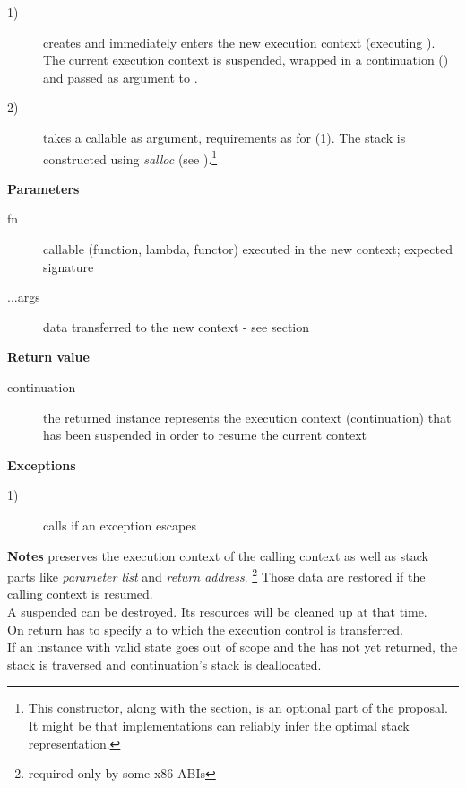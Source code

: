 \begin{description}
    \item[1)] creates and immediately enters the new execution context
              (executing ). The current execution context is suspended,
              wrapped in a continuation (\cont) and passed as argument to
              .
    \item[2)] takes a callable as argument, requirements as for (1). The stack
              is constructed using \emph{salloc}
              (see ).\footnote{This constructor, along with
              the  section, is an optional part of the
              proposal. It might be that implementations can reliably infer the
              optimal stack representation.}
\end{description}

{\bfseries Parameters}
\begin{description}
    \item[fn]      callable (function, lambda, functor) executed in the new
                   context; expected signature  
    \item[...args] data transferred to the new context - see section
                   \\
\end{description}

{\bfseries Return value}
\begin{description}
    \item[continuation] the returned instance represents the execution context
                        (continuation) that has been suspended in order to
                        resume the current context
\end{description}

{\bfseries Exceptions}
\begin{description}
    \item[1)] calls  if an exception escapes \entryfn
              \\
\end{description}

{\bfseries Notes}
\newline
\call preserves the execution context of the calling context as well as stack
parts like \emph{parameter list} and \emph{return address}.
\footnote{required only by some x86 ABIs} Those data are restored if the calling
context is resumed.\\
A suspended  can be destroyed. Its resources will be cleaned
up at that time.\\
On return  has to specify a \cont to which the execution control is
transferred.\\
If an instance with valid state goes out of scope and the  has not yet
returned, the stack is traversed  and continuation's stack is deallocated.


